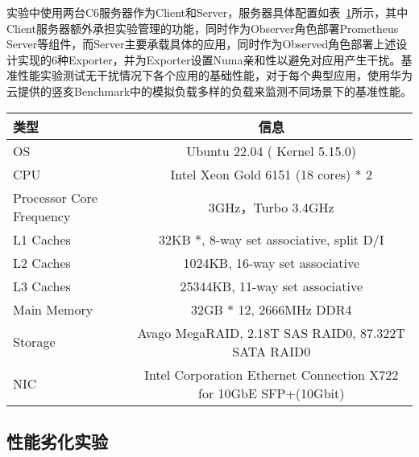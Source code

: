 实验中使用两台C6服务器作为Client和Server，服务器具体配置如表~\ref{tab:c6_info}所示，其中Client服务器额外承担实验管理的功能，同时作为Observer角色部署Prometheus Server等组件，而Server主要承载具体的应用，同时作为Observed角色部署上述设计实现的6种Exporter，并为Exporter设置Numa亲和性以避免对应用产生干扰。基准性能实验测试无干扰情况下各个应用的基础性能，对于每个典型应用，使用华为云提供的竖亥Benchmark中的模拟负载多样的负载来监测不同场景下的基准性能。

\begin{table}
    \label{tab:c6_info}
    \footnotesize%
    \setlength{\tabcolsep}{4pt}%
    \renewcommand{\arraystretch}{1.5}%
    \centering
    \begin{tabular}{lc}
        \hline
        类型 & 信息 \\
        \hline
        OS & Ubuntu 22.04 ( Kernel 5.15.0) \\
        CPU & Intel Xeon Gold 6151 (18 cores) * 2 \\
        Processor Core Frequency & 3GHz，Turbo 3.4GHz \\
        L1 Caches & 32KB *,  8-way set associative, split D/I \\
        L2 Caches & 1024KB, 16-way set associative \\
        L3 Caches & 25344KB, 11-way set associative \\
        Main Memory & 32GB * 12, 2666MHz DDR4 \\
        Storage & Avago MegaRAID, 2.18T SAS RAID0, 87.322T SATA RAID0 \\
        NIC & Intel Corporation Ethernet Connection X722 for 10GbE SFP+(10Gbit) \\
        \hline
    \end{tabular}
\end{table}







\subsection{性能劣化实验}

